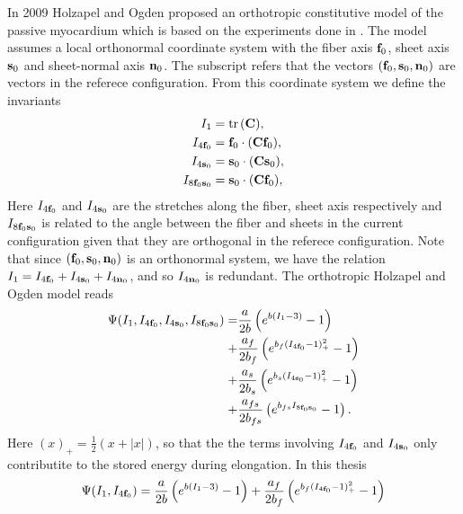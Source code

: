 In 2009 Holzapel and Ogden proposed an orthotropic constitutive model
of the passive myocardium \cite{holzapfel2009constitutive} which is
based on the experiments done in \cite{dokos2002shear}. The model
assumes a local orthonormal coordinate system with the fiber axis
$\mathbf{f}_0$, sheet axis $\mathbf{s}_0$ and sheet-normal axis $\mathbf{n}_0$. The subscript
refers that the vectors $(\mathbf{f}_0, \mathbf{s}_0, \mathbf{n}_0)$ are vectors in the referece
configuration. From this coordinate system we define the invariants
\begin{align}
  \begin{split}
    I_1 &= \mathrm{tr} \hspace{0.05cm}(\mathbf{C}) ,\\
    I_{4\mathbf{f}_0} &= \mathbf{f}_0 \cdot (\mathbf{C} \mathbf{f}_0),\\
    I_{4\mathbf{s}_0} &= \mathbf{s}_0 \cdot (\mathbf{C} \mathbf{s}_0),\\
    I_{8\mathbf{f}_0\mathbf{s}_0} &=  \mathbf{s}_0 \cdot (\mathbf{C} \mathbf{f}_0), 
  \end{split}
\end{align}
Here $I_{4\mathbf{f}_0} $ and $I_{4\mathbf{s}_0}$ are the stretches along the
fiber, sheet axis respectively and $I_{8\mathbf{f}_0\mathbf{s}_0}$ is
related to the angle between the fiber and sheets in the current
configuration given that they are orthogonal in the referece
configuration. Note that since $(\mathbf{f}_0, \mathbf{s}_0, \mathbf{n}_0)$ is an orthonormal
system, we have the relation $I_1 = I_{4\mathbf{f}_0} + I_{4\mathbf{s}_0} +I_{4\mathbf{n}_0}$,
and so $I_{4\mathbf{n}_0}$ is redundant. The orthotropic Holzapel and Ogden
model reads
\begin{align}
  \label{eq:holzapel_full}
  \begin{split}
  \Psi(I_1, I_{4\mathbf{f}_0},  I_{4\mathbf{s}_0},  I_{8\mathbf{f}_0\mathbf{s}_0}) =& \frac{a}{2 b} \left( e^{ b (I_1 - 3)}  -1 \right)\\
  +& \frac{a_f}{2 b_f} \left( e^{ b_f (I_{4\mathbf{f}_0} - 1)_+^2} -1 \right) \\
  +& \frac{a_s}{2 b_s} \left( e^{ b_s (I_{4\mathbf{s}_0} - 1)_+^2} -1 \right)\\
  +& \frac{a_{fs}}{2 b_{fs}} \left( e^{ b_{fs} I_{8\mathbf{f}_0\mathbf{s}_0}} -1 \right).
\end{split}
\end{align}
Here $( x )_+ = \frac{1}{2} \left( x + |x| \right)$, so that the
the terms involving $I_{4\mathbf{f}_0}$ and $I_{4\mathbf{s}_0}$ only contributite to the
stored energy during elongation. In this thesis 
\begin{align}
  \label{eq:holzapel_trans}
  \begin{split}
  \Psi(I_1, I_{4\mathbf{f}_0}) = \frac{a}{2 b} \left( e^{ b (I_1 - 3)}  -1 \right)
  + \frac{a_f}{2 b_f} \left( e^{ b_f (I_{4\mathbf{f}_0} - 1)_+^2} -1 \right)
  \end{split}
\end{align}

